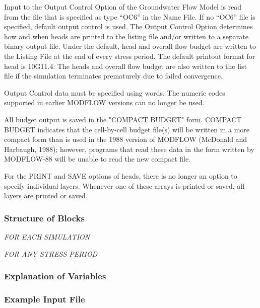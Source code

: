 Input to the Output Control Option of the Groundwater Flow Model is read from the file that is specified as type ``OC6'' in the Name File. If no ``OC6'' file is specified, default output control is used. The Output Control Option determines how and when heads are printed to the listing file and/or written to a separate binary output file.  Under the default, head and overall flow budget are written to the Listing File at the end of every stress period. The default printout format for head is 10G11.4.  The heads and overall flow budget are also written to the list file if the simulation terminates prematurely due to failed convergence.  

Output Control data must be specified using words.  The numeric codes supported in earlier MODFLOW versions can no longer be used.

All budget output is saved in the "COMPACT BUDGET" form.  COMPACT BUDGET indicates that the cell-by-cell budget file(s) will be written in a more compact form than is used in the 1988 version of MODFLOW (McDonald and Harbaugh, 1988); however, programs that read these data in the form written by MODFLOW-88 will be unable to read the new compact file. 

For the PRINT and SAVE options of heads, there is no longer an option to specify individual layers.  Whenever one of these arrays is printed or saved, all layers are printed or saved.

\vspace{5mm}
\subsubsection{Structure of Blocks}
\vspace{5mm}

\noindent \textit{FOR EACH SIMULATION}

\vspace{5mm}
\noindent \textit{FOR ANY STRESS PERIOD}


\vspace{5mm}
\subsubsection{Explanation of Variables}
\begin{description}

\end{description}

\vspace{5mm}
\subsubsection{Example Input File}

